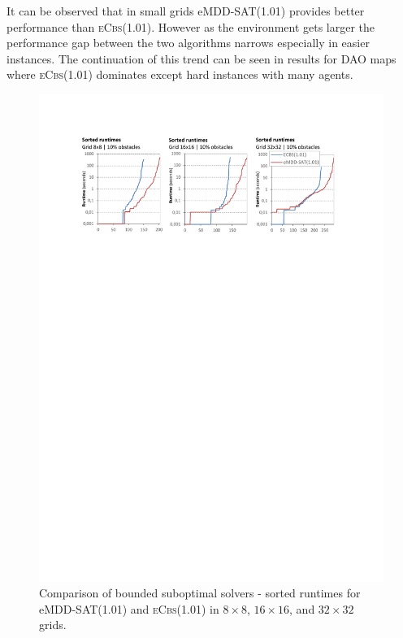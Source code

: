 \documentclass[jair,oneside,11pt]{article}
\begin{document}
It can be observed that in small grids eMDD-SAT(1.01) provides better performance than \textsc{eCbs}(1.01). However as the environment gets larger the performance gap between the two algorithms narrows especially in easier instances. The continuation of this trend can be seen in results for DAO maps where \textsc{eCbs}(1.01) dominates except hard instances with many agents.


\begin{figure}[h]
\centering
\includegraphics[trim={2.5cm 21.0cm 2.5cm 2.6cm},clip,width=\textwidth]{expr-sub_grids-E-sorted.pdf}
\vspace{-0.8cm}
\caption{Comparison of bounded suboptimal solvers  - sorted runtimes for eMDD-SAT(1.01) and \textsc{eCbs}(1.01)  in $8{}\times{}8$, $16{}\times{}16$, and $32{}\times{}32$ grids.}
\label{expr-sub_grids-E-sorted}
\end{figure}
\end{document}
